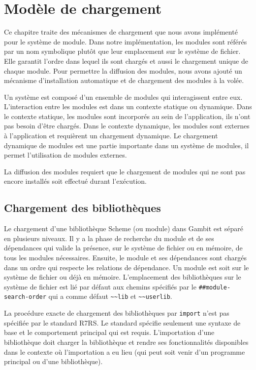
\chapter{Modèle de chargement}
\label{ch:loading-model}

Ce chapitre traite des mécanismes de chargement que nous avons implémenté pour
le système de module.  Dans notre implémentation, les modules sont référés par
un nom symbolique plutôt que leur emplacement sur le système de fichier. Elle
garantit l'ordre dans lequel ils sont chargés et aussi le chargement unique de
chaque module. Pour permettre la diffusion des modules, nous avons ajouté un
mécanisme d'installation automatique et de chargement des modules à la volée.

Un système est composé d'un ensemble de modules qui interagissent entre eux.
L'interaction entre les modules est dans un contexte statique ou dynamique.
Dans le contexte statique, les modules sont incorporés au sein de
l'application, ils n'ont pas besoin d'être chargés. Dans le contexte dynamique,
les modules sont externes à l'application et requièrent un chargement
dynamique.  Le chargement dynamique de modules est une partie importante dans
un système de modules, il permet l'utilisation de modules externes.

La diffusion des modules requiert que le chargement de modules qui ne sont
pas encore installés soit effectué durant l'exécution.

\section{Chargement des bibliothèques}


Le chargement d'une bibliothèque Scheme (ou module) dans Gambit est séparé en
plusieurs niveaux. Il y a la phase de recherche du module et de ses dépendances
qui valide la présence, sur le système de fichier ou en mémoire, de tous les
modules nécessaires.  Ensuite, le module et ses dépendances sont chargés dans un
ordre qui respecte les relations de dépendance.  Un module est soit sur le
système de fichier ou déjà en mémoire.  L'emplacement des bibliothèques sur le système de
fichier est lié par défaut aux chemins spécifiés par le
\lstinline{##module-search-order} qui a comme défaut \lstinline{~~lib} et
\lstinline{~~userlib}.

La procédure exacte de chargement des bibliothèques par \texttt{import} n'est pas
spécifiée par le standard R7RS. Le standard spécifie seulement une syntaxe de
base et le comportement principal qui est requis. L'importation d'une
bibliothèque doit charger la bibliothèque et rendre ses fonctionnalités
disponibles dans le contexte où l'importation a eu lieu (qui peut soit venir d'un
programme principal ou d'une bibliothèque).

